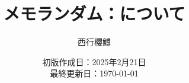 \newcommand{\CATEGORY}{メモランダム}%
\newcommand{\TITLE}{\WordGorensteinCategory について}
\newcommand{\AUTHORNAME}{西行櫻鱒}
\newcommand{\CREATEDAT}{2025年2月21日}

\title{\CATEGORY：\TITLE}
\author{\AUTHORNAME}
\date{初版作成日：\CREATEDAT\\最終更新日：\today\\}

